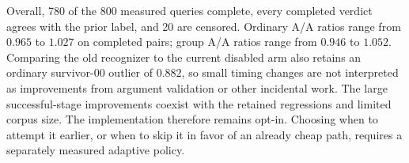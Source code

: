 Overall, 780 of the 800 measured queries complete, every completed verdict
agrees with the prior label, and 20 are censored. Ordinary A/A ratios range
from $0.965$ to $1.027$ on completed pairs; group A/A ratios range from
$0.946$ to $1.052$. Comparing the old recognizer to the current disabled arm
also retains an ordinary survivor-00 outlier of $0.882$, so small timing
changes are not interpreted as improvements from argument validation or
other incidental work. The large successful-stage improvements coexist
with the retained regressions and limited corpus size. The implementation
therefore remains opt-in. Choosing when to attempt it earlier, or when to
skip it in favor of an already cheap path, requires a separately measured
adaptive policy.
